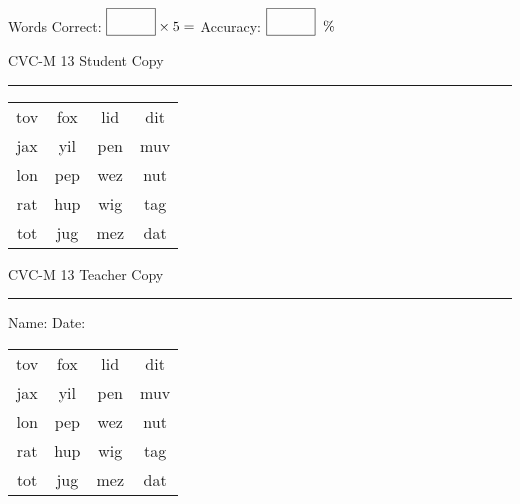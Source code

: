 \documentclass{memoir}
\begin{document}
\small

Words Correct: $\fbox{\phantom{\huge 100}} \times 5 = $ Accuracy: $\fbox{\phantom{\huge 100}}\;\; \%$ 

\vfill

\newpage


\footnotesize \noindent
CVC-M 13 \hfill Student Copy
\smallskip
\hrule

\Large

\setlength{\tabcolsep}{14pt}
\def\arraystretch{2}

{\selectfont


\begin{vplace}[0.5]
\begin{center}
\begin{tabular}{cccc}
tov & fox & lid & dit \\
jax & yil & pen & muv \\
lon & pep & wez & nut \\
rat & hup & wig & tag \\
tot & jug & mez & dat \\
\end{tabular}
\end{center}
\end{vplace}

}

\newpage

\footnotesize \noindent
CVC-M 13 \hfill Teacher Copy
\smallskip
\hrule

\small

\vfill

\noindent
Name: \underline{\hspace{1.75in}} \hfill Date: \underline{\hspace{1in}}

\Large

{\selectfont


\begin{vplace}[0.5]
\begin{center}
\begin{tabular}{cccc}
tov & fox & lid & dit \\
jax & yil & pen & muv \\
lon & pep & wez & nut \\
rat & hup & wig & tag \\
tot & jug & mez & dat \\
\end{tabular}
\end{center}
\end{vplace}



}
\end{document}
